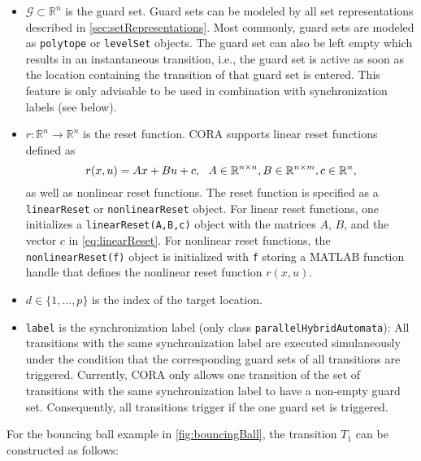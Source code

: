 \begin{itemize}
    \item $\mathcal{G} \subset \mathbb{R}^n$ is the guard set. Guard sets can be modeled by all set representations described in \cref{sec:setRepresentations}.
    Most commonly, guard sets are modeled as \texttt{polytope} or \texttt{levelSet} objects.
    The guard set can also be left empty which results in an instantaneous transition, i.e., the guard set is active as soon as the location containing the transition of that guard set is entered. This feature is only advisable to be used in combination with synchronization labels (see below).
    \item $r: \mathbb{R}^n \to \mathbb{R}^n$ is the reset function. CORA supports linear reset functions defined as
    \begin{equation}
        \label{eq:linearReset}
        r(x,u) = A x + B u + c, ~~ A \in \mathbb{R}^{n \times n}, B \in \mathbb{R}^{n \times m}, c \in \mathbb{R}^n,
    \end{equation}
    as well as nonlinear reset functions.
    The reset function is specified as a \texttt{linearReset} or \texttt{nonlinearReset} object.
    For linear reset functions, one initializes a \texttt{linearReset(A,B,c)} object with the matrices $A$, $B$, and the vector $c$ in \eqref{eq:linearReset}.
    For nonlinear reset functions, the \texttt{nonlinearReset(f)} object is initialized with \texttt{f} storing a MATLAB function handle that defines the nonlinear reset function $r(x,u)$.

    \item $d \in \{1,\dots,p\}$ is the index of the target location.
    \item \texttt{label} is the synchronization label (only class \texttt{parallelHybridAutomata}): All transitions with the same synchronization label are executed simulaneously under the condition that the corresponding guard sets of all transitions are triggered. Currently, CORA only allows one transition of the set of transitions with the same synchronization label to have a non-empty guard set.
    Consequently, all transitions trigger if the one guard set is triggered.
\end{itemize}

For the bouncing ball example in \cref{fig:bouncingBall}, the transition $T_1$ can be constructed as follows:

\begin{center}
    \begin{minipage}[t]{0.1\textwidth}
        \vspace{10pt}
    \end{minipage}
    \begin{minipage}[t]{0.8\textwidth}
        \footnotesize
        
    \end{minipage}
\end{center}

